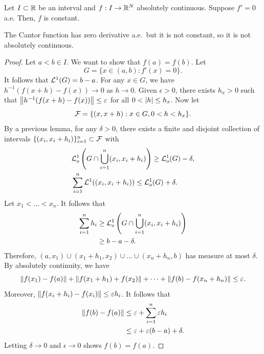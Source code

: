 \documentclass[a4paper]{article}
\begin{document}
\begin{thm}
  Let $I \subset \mathbb{R}$ be an interval and $f : I \to \mathbb{R}^N$ absolutely
  continuous. Suppose $f' = 0$ a.e. Then, $f$ is constant.
\end{thm}

\begin{eg}
  The Cantor function has zero derivative a.e.\ but it is not constant, so
  it is not absolutely continuous.
\end{eg}

\begin{proof}
  Let $a < b \in I$. We want to show that $f(a) = f(b)$. Let
  \[
    G = \{ x \in (a, b) : f'(x) = 0 \}.
  \]
  It follows that $\mathcal{L}^1 (G) = b - a$. For any $x \in G$, we have $h^{-1}
  (f(x + h) - f(x)) \to 0$ as $h \to 0$. Given $\epsilon > 0$, there
  exists $h_x > 0$ such that $\left\lVert h^{-1} (f(x + h) - f(x))\right\rVert \leq
  \varepsilon$ for all $0 < \left\lvert h\right\rvert \leq h_x$. Now let
  \[
    \mathcal{F} = \{ (x, x + h) : x \in G, 0 < h < h_x \}.
  \]
  By a previous lemma, for any $\delta > 0$, there exists a finite and
  disjoint collection of intervals $\{ (x_i, x_i + h_i) \}_{i=1}^n \subset
  \mathcal{F}$ with
  \begin{align*}
     & \mathcal{L}_o^1 \left( G \cap \bigcup_{i=1}^n (x_i, x_i + h_i) \right)
    \geq \mathcal{L}_o^1 (G) - \delta,                                    \\
     & \sum_{i=1}^n \mathcal{L}^1 ((x_i, x_i + h_i)) \leq \mathcal{L}_o^1 (G) + \delta.
  \end{align*}
  Let $x_1 < \dots < x_n$. It follows that
  \begin{align*}
    \sum_{i=1}^n h_i
     & \geq \mathcal{L}_o^1 \left( G \cap \bigcup_{i=1}^n (x_i, x_i + h_i) \right) \\
     & \geq b - a - \delta.
  \end{align*}
  Therefore, $(a, x_1) \cup (x_1 + h_1, x_2) \cup \dots \cup (x_n + h_n,
    b)$ has measure at most $\delta$. By absolutely continuity, we have
  \[
    \left\lVert f(x_1) - f(a)\right\rVert + \left\lVert f(x_1 + h_1) + f(x_2)\right\rVert
    + \dots + \left\lVert f(b) - f(x_n + h_n)\right\rVert \leq \varepsilon.
  \]
  Moreover, $\left\lVert f(x_i + h_i) - f(x_i)\right\rVert \leq \varepsilon h_i$. It follows
  that
  \begin{align*}
    \left\lVert f(b) - f(a)\right\rVert
     & \leq \varepsilon + \sum_{i=1}^n \varepsilon h_i       \\
     & \leq \varepsilon + \varepsilon (b - a) + \delta.
  \end{align*}
  Letting $\delta \to 0$ and $\epsilon \to 0$ shows $f(b) = f(a)$.
\end{proof}
\end{document}
